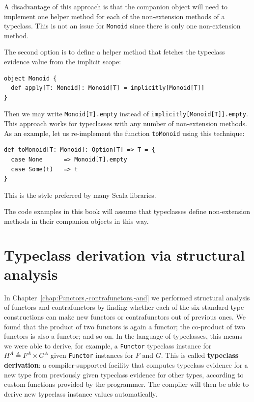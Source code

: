 A disadvantage of this approach is that the companion object will
need to implement one helper method for each of the non-extension
methods of a typeclass. This is not an issue for \lstinline!Monoid!
since there is only one non-extension method.

The second option is to define a helper method that fetches the typeclass
evidence value from the implicit scope:
\begin{lstlisting}
object Monoid {
  def apply[T: Monoid]: Monoid[T] = implicitly[Monoid[T]]
}
\end{lstlisting}
Then we may write \lstinline!Monoid[T].empty! instead of \lstinline!implicitly[Monoid[T]].empty!.
This approach works for typeclasses with any number of non-extension
methods. As an example, let us re-implement the function \lstinline!toMonoid!
using this technique:
\begin{lstlisting}
def toMonoid[T: Monoid]: Option[T] => T = {
  case None      => Monoid[T].empty
  case Some(t)   => t
}
\end{lstlisting}
This is the style preferred by many Scala libraries. 

The code examples in this book will assume that typeclasses define
non-extension methods in their companion objects in this way.

\section{Typeclass derivation via structural analysis\label{sec:Typeclass-derivation-via-structural-analysis}}

In Chapter~\ref{chap:Functors,-contrafunctors,-and} we performed
structural analysis of functors and contrafunctors by finding whether
each of the six standard type constructions can make new functors
or contrafunctors out of previous ones. We found that the product
of two functors is again a functor; the co-product of two functors
is also a functor; and so on. In the language of typeclasses, this
means we were able to derive, for example, a \lstinline!Functor!
typeclass instance for $H^{A}\triangleq F^{A}\times G^{A}$ given
\lstinline!Functor! instances for $F$ and $G$. This is called
\textbf{typeclass derivation}: a compiler-supported facility that
computes typeclass evidence for a new type from previously given typeclass
evidence for other types, according to custom functions provided by
the programmer. The compiler will then be able to derive new typeclass
instance values automatically.

